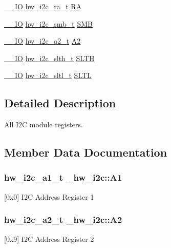 \begin{DoxyCompactItemize}
\hyperlink{core__sc300_8h_aec43007d9998a0a0e01faede4133d6be}{\+\_\+\+\_\+\+IO} \hyperlink{union__hw__i2c__ra}{hw\+\_\+i2c\+\_\+ra\+\_\+t} \hyperlink{struct__hw__i2c_a1b3d34b5c52f3d3b15d1ee67e95ee84c}{RA}
\item 
\hyperlink{core__sc300_8h_aec43007d9998a0a0e01faede4133d6be}{\+\_\+\+\_\+\+IO} \hyperlink{union__hw__i2c__smb}{hw\+\_\+i2c\+\_\+smb\+\_\+t} \hyperlink{struct__hw__i2c_a5a11b7d7df6e7bf1cc6287c3f9b8e3df}{S\+MB}
\item 
\hyperlink{core__sc300_8h_aec43007d9998a0a0e01faede4133d6be}{\+\_\+\+\_\+\+IO} \hyperlink{union__hw__i2c__a2}{hw\+\_\+i2c\+\_\+a2\+\_\+t} \hyperlink{struct__hw__i2c_a75ca913abbaaf0fe4165e7f1f7db99ef}{A2}
\item 
\hyperlink{core__sc300_8h_aec43007d9998a0a0e01faede4133d6be}{\+\_\+\+\_\+\+IO} \hyperlink{union__hw__i2c__slth}{hw\+\_\+i2c\+\_\+slth\+\_\+t} \hyperlink{struct__hw__i2c_a40ec44b385ce62222d6ceddc4beca39f}{S\+L\+TH}
\item 
\hyperlink{core__sc300_8h_aec43007d9998a0a0e01faede4133d6be}{\+\_\+\+\_\+\+IO} \hyperlink{union__hw__i2c__sltl}{hw\+\_\+i2c\+\_\+sltl\+\_\+t} \hyperlink{struct__hw__i2c_ab3913e9aacd90d62255434b2f1cb43c2}{S\+L\+TL}
\end{DoxyCompactItemize}


\subsection{Detailed Description}
All I2C module registers. 

\subsection{Member Data Documentation}
\subsubsection[{\texorpdfstring{A1}{A1}}]{ {\bf hw\+\_\+i2c\+\_\+a1\+\_\+t} \+\_\+hw\+\_\+i2c\+::\+A1}\hypertarget{struct__hw__i2c_ae94f7a6cdde66b8cf451e97dde74003c}{}\label{struct__hw__i2c_ae94f7a6cdde66b8cf451e97dde74003c}
\mbox{[}0x0\mbox{]} I2C Address Register 1 
\subsubsection[{\texorpdfstring{A2}{A2}}]{ {\bf hw\+\_\+i2c\+\_\+a2\+\_\+t} \+\_\+hw\+\_\+i2c\+::\+A2}\hypertarget{struct__hw__i2c_a75ca913abbaaf0fe4165e7f1f7db99ef}{}\label{struct__hw__i2c_a75ca913abbaaf0fe4165e7f1f7db99ef}
\mbox{[}0x9\mbox{]} I2C Address Register 2 
